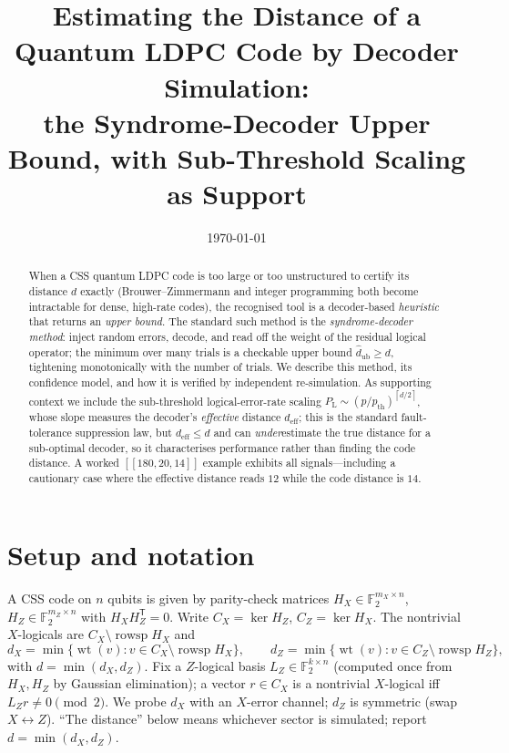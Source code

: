 \documentclass[11pt]{article}
\title{\bfseries Estimating the Distance of a Quantum LDPC Code by Decoder
Simulation:\\ the Syndrome-Decoder Upper Bound, with Sub-Threshold Scaling as
Support}
\author{}
\date{\today}
\DeclareMathOperator{\wt}{wt}
\DeclareMathOperator{\rowsp}{rowsp}
\newcommand{\F}{\mathbb{F}}
\newcommand{\PL}{P_{\mathrm{L}}}
\newcommand{\HX}{H_X}
\newcommand{\HZ}{H_Z}
\newcommand{\dub}{\hat d_{\mathrm{ub}}}
\newcommand{\deff}{d_{\mathrm{eff}}}
\newcommand{\ceil}[1]{\left\lceil #1 \right\rceil}
\begin{document}
\maketitle

\begin{abstract}
When a CSS quantum LDPC code is too large or too unstructured to certify its
distance $d$ exactly (Brouwer--Zimmermann and integer programming both become
intractable for dense, high-rate codes), the recognised tool is a decoder-based
\emph{heuristic} that returns an \emph{upper bound}. The standard such method is
the \emph{syndrome-decoder method}: inject random errors, decode, and read off the
weight of the residual logical operator; the minimum over many trials is a
checkable upper bound $\dub\ge d$, tightening monotonically with the number of
trials. We describe this method, its confidence model, and how it is verified by
independent re-simulation. As supporting context we include the sub-threshold
logical-error-rate scaling $\PL\sim(p/p_{\mathrm{th}})^{\ceil{d/2}}$, whose slope
measures the decoder's \emph{effective} distance $\deff$; this is the standard
fault-tolerance suppression law, but $\deff\le d$ and can \emph{under}estimate the
true distance for a sub-optimal decoder, so it characterises performance rather
than finding the code distance. A worked $[[180,20,14]]$ example exhibits all
signals---including a cautionary case where the effective distance reads $12$
while the code distance is $14$.
\end{abstract}

\section{Setup and notation}
\label{sec:setup}

A CSS code on $n$ qubits is given by parity-check matrices
$\HX\in\F_2^{m_X\times n}$, $\HZ\in\F_2^{m_Z\times n}$ with $\HX\HZ^{\mathsf T}=0$.
Write $C_X=\ker\HZ$, $C_Z=\ker\HX$. The nontrivial $X$-logicals are
$C_X\setminus\rowsp\HX$ and
\begin{equation}
  d_X=\min\{\wt(v): v\in C_X\setminus\rowsp\HX\},\qquad
  d_Z=\min\{\wt(v): v\in C_Z\setminus\rowsp\HZ\},
\end{equation}
with $d=\min(d_X,d_Z)$. Fix a $Z$-logical basis $L_Z\in\F_2^{k\times n}$
(computed once from $\HX,\HZ$ by Gaussian elimination); a vector $r\in C_X$ is a
nontrivial $X$-logical iff $L_Z r\neq 0\pmod 2$. We probe $d_X$ with an $X$-error
channel; $d_Z$ is symmetric (swap $X\leftrightarrow Z$). ``The distance'' below
means whichever sector is simulated; report $d=\min(d_X,d_Z)$.
\end{document}

